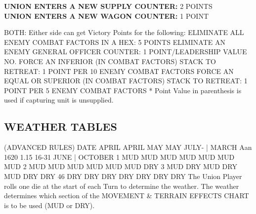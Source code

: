 \begin{scenariodata}
\textbf{UNION ENTERS A NEW SUPPLY COUNTER:} 2 POINTS\\
\textbf{UNION ENTERS A NEW WAGON COUNTER:} 1 POINT\\
\end{scenariodata}

BOTH: Either side can get Victory Points for the following: ELIMINATE ALL ENEMY COMBAT FACTORS IN A HEX: 5 POINTS ELIMINATE AN ENEMY GENERAL OFFICER COUNTER: 1 POINT/LEADERSHIP VALUE NO. FORCE AN INFERIOR (IN COMBAT FACTORS) STACK TO RETREAT: 1 POINT PER 10 ENEMY COMBAT FACTORS FORCE AN EQUAL OR SUPERIOR (IN COMBAT FACTORS) STACK TO RETREAT: 1 POINT PER 5 ENEMY COMBAT FACTORS * Point Value in parenthesis is used if capturing unit is unsupplied.

\subsection*{WEATHER TABLES}

(ADVANCED RULES) DATE APRIL APRIL MAY MAY JULY- | MARCH Aan 1620 1.15 16-31 JUNE | OCTOBER 1 MUD MUD MUD MUD MUD MUD MUD 2 MUD MUD MUD MUD MUD MUD DRY 3 MUD DRY MUD DRY MUD DRY DRY 46 DRY DRY DRY DRY DRY DRY DRY The Union Player rolls one die at the start of each Turn to determine the weather. The weather determines which section of the MOVEMENT \& TERRAIN EFFECTS CHART is to be used (MUD or DRY).

